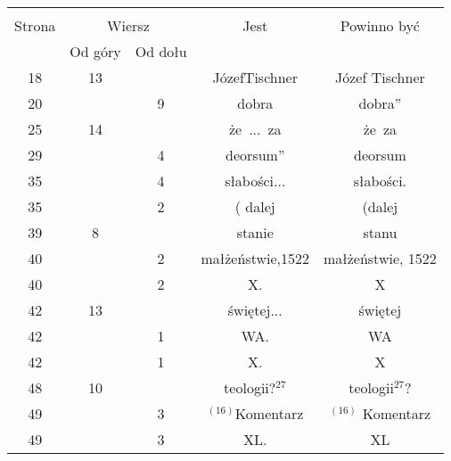 \documentclass[a4paper,11pt]{article}
\begin{document}
\begin{center}
  \begin{tabular}{|c|c|c|c|c|}
    \hline
    & \multicolumn{2}{c|}{} & & \\
    Strona & \multicolumn{2}{c|}{Wiersz} & Jest
                              & Powinno być \\ \cline{2-3}
    & Od góry & Od dołu & & \\
    \hline
    18  & 13 & & JózefTischner & Józef Tischner \\
    20  & &  9 & dobra & dobra'' \\
    25  & 14 & & że~...~za & że~za \\
    29  & &  4 & deorsum'' & deorsum \\
    35  & &  4 & słabości... & słabości. \\
    35  & &  2 & ( dalej & (dalej \\
    39  &  8 & & stanie & stanu \\
    40  & &  2 & małżeństwie,1522 & małżeństwie, 1522 \\
    40  & &  2 & X. & X \\
    42  & 13 & & świętej... & świętej \\
    42  & &  1 & WA. & WA \\
    42  & &  1 & X. & X \\
    48  & 10 & & teologii?$^{ 27 }$ & teologii$^{ 27 }$? \\
    49  & &  3 & $^{ ( 16 ) }$Komentarz & $^{ ( 16 ) }$ Komentarz \\
    49  & &  3 & XL. & XL \\
    \hline
  \end{tabular}


\end{center}
\end{document}
